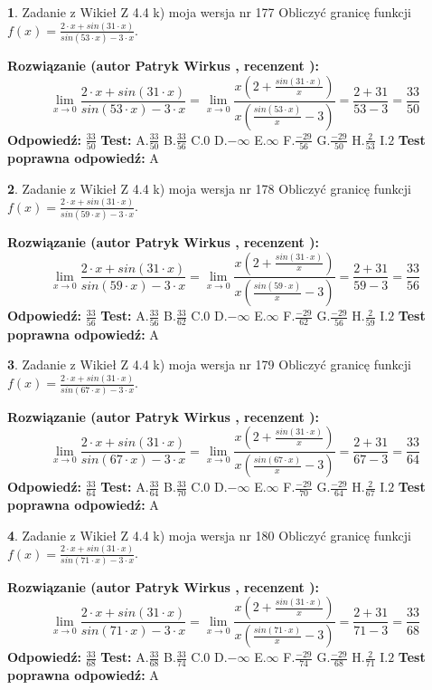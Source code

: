 \documentclass[12pt, a4paper]{article}
\theoremstyle{definition} %
\newtheorem{zad}{}
\newcommand{\zadStart}[1]{\begin{zad}#1\newline}
\newcommand{\zadStop}{\end{zad}}
\newcommand{\rozwStart}[2]{\noindent \textbf{Rozwiązanie (autor #1 , recenzent #2): }\newline}
\newcommand{\rozwStop}{\newline}
\newcommand{\odpStart}{\noindent \textbf{Odpowiedź:}\newline}
\newcommand{\odpStop}{\newline}
\newcommand{\testStart}{\noindent \textbf{Test:}\newline}
\newcommand{\testStop}{\newline}
\newcommand{\kluczStart}{\noindent \textbf{Test poprawna odpowiedź:}\newline}
\newcommand{\kluczStop}{\newline}
\begin{document}
\zadStart{Zadanie z Wikieł Z 4.4 k) moja wersja nr 177}
Obliczyć granicę funkcji $f(x)=\frac{2\cdot x +sin(31\cdot x)}{sin(53\cdot x) -3\cdot x}$.
\zadStop
\rozwStart{Patryk Wirkus}{}
$$\lim\limits_{x\to 0}\frac{2\cdot x +sin(31\cdot x)}{sin(53\cdot x) -3\cdot x}
=\lim\limits_{x\to 0}\frac{x(2+\frac{sin(31\cdot x)}{x})}{x(\frac{sin(53\cdot x)}{x}-3)}
=\frac{2+31}{53-3} = \frac{33}{50}$$
\rozwStop
\odpStart
$\frac{33}{50}$
\odpStop
\testStart
A.$\frac{33}{50}$
B.$\frac{33}{56}$
C.$0$
D.$-\infty$
E.$\infty$
F.$\frac{-29}{56}$
G.$\frac{-29}{50}$
H.$\frac{2}{53}$
I.$2$
\testStop
\kluczStart
A
\kluczStop



\zadStart{Zadanie z Wikieł Z 4.4 k) moja wersja nr 178}
Obliczyć granicę funkcji $f(x)=\frac{2\cdot x +sin(31\cdot x)}{sin(59\cdot x) -3\cdot x}$.
\zadStop
\rozwStart{Patryk Wirkus}{}
$$\lim\limits_{x\to 0}\frac{2\cdot x +sin(31\cdot x)}{sin(59\cdot x) -3\cdot x}
=\lim\limits_{x\to 0}\frac{x(2+\frac{sin(31\cdot x)}{x})}{x(\frac{sin(59\cdot x)}{x}-3)}
=\frac{2+31}{59-3} = \frac{33}{56}$$
\rozwStop
\odpStart
$\frac{33}{56}$
\odpStop
\testStart
A.$\frac{33}{56}$
B.$\frac{33}{62}$
C.$0$
D.$-\infty$
E.$\infty$
F.$\frac{-29}{62}$
G.$\frac{-29}{56}$
H.$\frac{2}{59}$
I.$2$
\testStop
\kluczStart
A
\kluczStop



\zadStart{Zadanie z Wikieł Z 4.4 k) moja wersja nr 179}
Obliczyć granicę funkcji $f(x)=\frac{2\cdot x +sin(31\cdot x)}{sin(67\cdot x) -3\cdot x}$.
\zadStop
\rozwStart{Patryk Wirkus}{}
$$\lim\limits_{x\to 0}\frac{2\cdot x +sin(31\cdot x)}{sin(67\cdot x) -3\cdot x}
=\lim\limits_{x\to 0}\frac{x(2+\frac{sin(31\cdot x)}{x})}{x(\frac{sin(67\cdot x)}{x}-3)}
=\frac{2+31}{67-3} = \frac{33}{64}$$
\rozwStop
\odpStart
$\frac{33}{64}$
\odpStop
\testStart
A.$\frac{33}{64}$
B.$\frac{33}{70}$
C.$0$
D.$-\infty$
E.$\infty$
F.$\frac{-29}{70}$
G.$\frac{-29}{64}$
H.$\frac{2}{67}$
I.$2$
\testStop
\kluczStart
A
\kluczStop



\zadStart{Zadanie z Wikieł Z 4.4 k) moja wersja nr 180}
Obliczyć granicę funkcji $f(x)=\frac{2\cdot x +sin(31\cdot x)}{sin(71\cdot x) -3\cdot x}$.
\zadStop
\rozwStart{Patryk Wirkus}{}
$$\lim\limits_{x\to 0}\frac{2\cdot x +sin(31\cdot x)}{sin(71\cdot x) -3\cdot x}
=\lim\limits_{x\to 0}\frac{x(2+\frac{sin(31\cdot x)}{x})}{x(\frac{sin(71\cdot x)}{x}-3)}
=\frac{2+31}{71-3} = \frac{33}{68}$$
\rozwStop
\odpStart
$\frac{33}{68}$
\odpStop
\testStart
A.$\frac{33}{68}$
B.$\frac{33}{74}$
C.$0$
D.$-\infty$
E.$\infty$
F.$\frac{-29}{74}$
G.$\frac{-29}{68}$
H.$\frac{2}{71}$
I.$2$
\testStop
\kluczStart
A
\kluczStop
\end{document}
